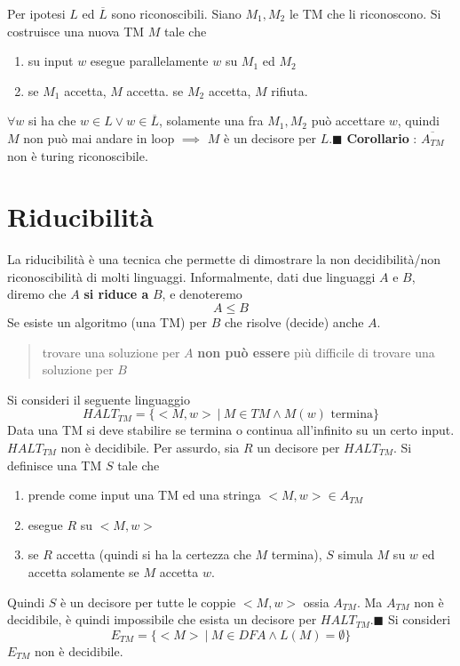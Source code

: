 \documentclass[10pt, letterpaper]{report}
\begin{document}
\boxedMath{$\impliedby$} Per ipotesi $L$ ed $\overline{L}$ sono riconoscibili. Siano $M_1,M_2$ le TM che li riconoscono. Si costruisce una nuova TM $M$ tale che \begin{enumerate}
    \item su input $w$ esegue parallelamente $w$ su $M_1$ ed $M_2$
    \item se $M_1$ accetta, $M$ accetta. se $M_2$ accetta, $M$ rifiuta.
\end{enumerate}
$\forall w$ si ha che $w\in L \lor w\in \overline{L}$, solamente una fra $M_1,M_2$ può accettare $w$, quindi $M$ non può mai andare in loop $\implies$ $M$ è un decisore per $L$.\hfill$\blacksquare$\acc 
\textbf{Corollario} : $\overline{A_{TM}}$ non è turing riconoscibile.\flowerLine 
\section{Riducibilità}
La riducibilità è una tecnica che permette di dimostrare la non decidibilità/non riconoscibilità di molti linguaggi. Informalmente, dati due linguaggi $A$ e $B$,  diremo che $A$ \textbf{si riduce a} $B$, e denoteremo $$ A\le B$$ Se esiste un algoritmo (una TM) per $B$ che risolve (decide) anche $A$.\begin{quotation}
    trovare una soluzione per $A$ \textbf{non può essere} più difficile di trovare una soluzione per $B$
\end{quotation}
Si consideri il seguente linguaggio 
$$ HALT_{TM}=\{<M,w> \ | \ M\in TM\land M(w)\text{ termina} \}$$
Data una TM si deve stabilire se termina o continua all'infinito su un certo input.\acc 
{} $HALT_{TM}$ non è decidibile.\acc 
\dimo{} Per assurdo, sia $R$ un decisore per $HALT_{TM}$. Si definisce una TM $S$ tale che \begin{enumerate}
    \item prende come input una TM ed una stringa $<M,w>\in A_{TM}$
    \item esegue $R$ su $<M,w>$
    \item se $R$ accetta (quindi si ha la certezza che $M$ termina), $S$ simula $M$ su $w$ ed accetta solamente se $M$ accetta $w$.
\end{enumerate}
Quindi $S$ è un decisore per tutte le coppie $<M,w>$ ossia $A_{TM}$. Ma $A_{TM}$ non è decidibile, è quindi impossibile che esista un decisore per $HALT_{TM}$.\hfill$\blacksquare$\acc 
Si consideri 
$$ E_{TM}=\{<M>\ | \ M\in DFA \land L(M)=\emptyset\}$$
\prop{} $E_{TM}$ non è decidibile.\acc 
\end{document}
